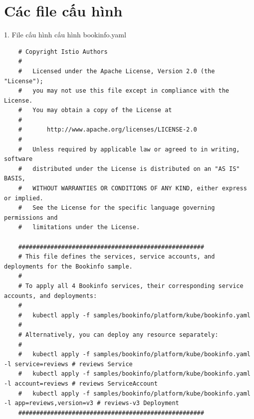 \documentclass[12pt,a4paper]{report}
\begin{document}
{{\chapter{Các file cấu hình}
1. File cấu hình cấu hình bookinfo.yaml
\begin{lstlisting}
	# Copyright Istio Authors
	#
	#   Licensed under the Apache License, Version 2.0 (the "License");
	#   you may not use this file except in compliance with the License.
	#   You may obtain a copy of the License at
	#
	#       http://www.apache.org/licenses/LICENSE-2.0
	#
	#   Unless required by applicable law or agreed to in writing, software
	#   distributed under the License is distributed on an "AS IS" BASIS,
	#   WITHOUT WARRANTIES OR CONDITIONS OF ANY KIND, either express or implied.
	#   See the License for the specific language governing permissions and
	#   limitations under the License.
	
	####################################################
	# This file defines the services, service accounts, and deployments for the Bookinfo sample.
	#
	# To apply all 4 Bookinfo services, their corresponding service accounts, and deployments:
	#
	#   kubectl apply -f samples/bookinfo/platform/kube/bookinfo.yaml
	#
	# Alternatively, you can deploy any resource separately:
	#
	#   kubectl apply -f samples/bookinfo/platform/kube/bookinfo.yaml -l service=reviews # reviews Service
	#   kubectl apply -f samples/bookinfo/platform/kube/bookinfo.yaml -l account=reviews # reviews ServiceAccount
	#   kubectl apply -f samples/bookinfo/platform/kube/bookinfo.yaml -l app=reviews,version=v3 # reviews-v3 Deployment
	####################################################
	

\end{lstlisting}}}
\end{document}
